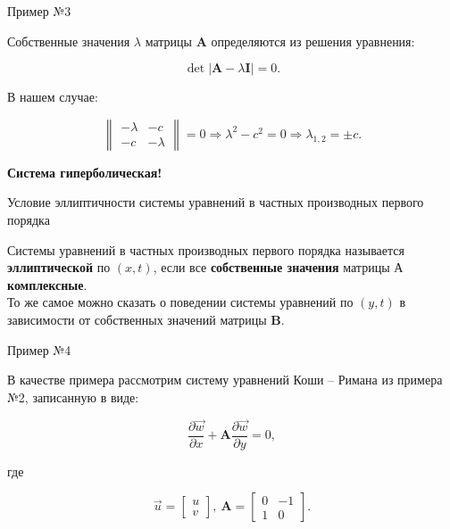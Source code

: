 \documentclass[10pt,xcolor=pst,aspectratio=169]{beamer}
\begin{document}
\begin{frame}{Пример №3}

	\transdissolve[duration=0.1]
	\justifying
	\large

	Собственные значения $\lambda$ матрицы $\textbf{A}$ определяются из решения уравнения:

	\[
		\det \left| \textbf{A} - \lambda \textbf{I} \right| = 0.
	\]

	В нашем случае:

	\[
		\begin{Vmatrix}
			- \lambda & - c \\
			-c & - \lambda
		\end{Vmatrix}
		= 0
		\Rightarrow \lambda^2 - c^{2} = 0
		\Rightarrow \lambda_{1,2} = \pm c.
	\]

	\textbf{Система гиперболическая!}

\end{frame}

\begin{frame}{Условие эллиптичности системы уравнений в частных производных первого порядка}

	\transdissolve[duration=0.1]
	\justifying
	\large

	Системы уравнений в частных производных первого порядка называется \textbf{эллиптической} по $(x,t)$, если все \textbf{собственные значения} матрицы $\textbf{А}$ \textbf{комплексные}.\\

	То же самое можно сказать о поведении системы уравнений по $(y,t)$ в зависимости от собственных значений матрицы $\textbf{B}$.

\end{frame}

\begin{frame}{Пример №4}

	\transdissolve[duration=0.1]
	\justifying
	\large

	В качестве примера рассмотрим систему уравнений Коши -- Римана из примера №2, записанную в виде:

	\[
		\frac{\partial \vec{w}}{\partial x} + \textbf{A} \frac{\partial \vec{w}}{\partial y} = 0,
	\]

	где

	\[
		\vec{u}
		=
		\begin{bmatrix}
			u \\
			v
		\end{bmatrix}, \:
		\textbf{A}
		=
		\begin{bmatrix}
			0 & - 1 \\
			1 & 0
		\end{bmatrix}.
	\]

\end{frame}
\end{document}
